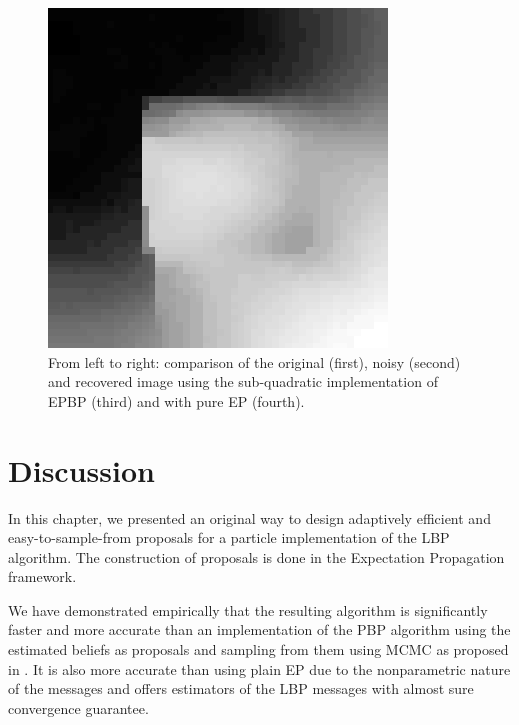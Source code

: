 \begin{figure}[!h]
\hspace*{.3cm}
\includegraphics[scale=.28]{figures/epbp/denoisingEP2}
\caption{\label{figIMG} From left to right: comparison of the original (first), noisy (second) and recovered image using the sub-quadratic implementation of EPBP (third) and with pure EP (fourth). %
}
\end{figure}


\section{Discussion}

In this chapter, we presented an original way to design adaptively efficient and easy-to-sample-from proposals for a particle implementation of the LBP algorithm. The construction of proposals is done in the Expectation Propagation framework.

We have demonstrated empirically that the resulting algorithm is significantly faster and more accurate than an implementation of the PBP algorithm using the estimated beliefs as proposals and sampling from them using MCMC as proposed in \cite{ihler09}. 
It is also more accurate than using plain EP due to the nonparametric nature of the messages and offers estimators of the LBP messages with almost sure convergence guarantee. 

